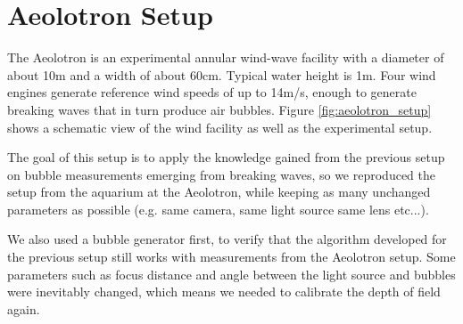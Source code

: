 	\section{Aeolotron Setup}
		The Aeolotron is an experimental annular wind-wave facility with a diameter of about 10m and a width of about 60cm. Typical water height is 1m. Four wind engines generate reference wind speeds of up to 14m/s, enough to generate breaking waves that in turn produce air bubbles. Figure \ref{fig:aeolotron_setup} shows a schematic view of the wind facility as well as the experimental setup.
		
		The goal of this setup is to apply the knowledge gained from the previous setup on bubble measurements emerging from breaking waves, so we reproduced the setup from the aquarium at the Aeolotron, while keeping as many unchanged parameters as possible (e.g. same camera, same light source same lens etc...). 
		
	We also used a bubble generator first, to verify that the algorithm developed for the previous setup still works with measurements from the Aeolotron setup. Some parameters such as focus distance and angle between the light source and bubbles were inevitably changed, which means we needed to calibrate the depth of field again. 
		

